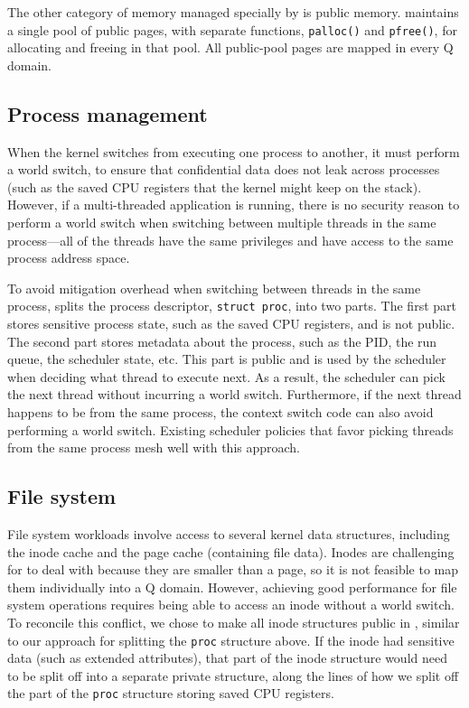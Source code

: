 The other category of memory managed specially by \sys is public memory.
\sys maintains a single pool of public pages, with separate functions,
\texttt{palloc()} and \texttt{pfree()}, for allocating and freeing in
that pool.  All public-pool pages are mapped in every Q domain.


\subsection{Process management}
\label{ss:proc}

When the \sys kernel switches from executing one process to another, it
must perform a world switch, to ensure that confidential data does not
leak across processes (such as the saved CPU registers that the kernel
might keep on the stack).  However, if a multi-threaded application
is running, there is no security reason to perform a world switch when
switching between multiple threads in the same process---all of the
threads have the same privileges and have access to the same process
address space.

To avoid mitigation overhead when switching between threads in the
same process, \sys splits the process descriptor, \texttt{struct
  proc}, into two parts.  The first part stores sensitive process
state, such as the saved CPU registers, and is not public.  The second
part stores metadata about the process, such as the PID, the run
queue, the scheduler state, etc.  This part is public and is used by
the scheduler when deciding what thread to execute next.  As a result,
the scheduler can pick the next thread without incurring a world
switch.  Furthermore, if the next thread happens to be from the same
process, the context switch code can also avoid performing a world
switch.  Existing scheduler policies that favor picking threads from
the same process mesh well with this approach.

\subsection{File system}
\label{ss:fs}

File system workloads involve access to several kernel data structures,
including the inode cache and the page cache (containing file data).
Inodes are challenging for \sys to deal with because they are smaller than
a page, so it is not feasible to map them individually into a Q domain.
However, achieving good performance for file system operations requires
being able to access an inode without a world switch.  To reconcile
this conflict, we chose to make all inode structures public in \sys,
similar to our approach for splitting the \texttt{proc} structure above.
If the inode had sensitive data (such as extended attributes), that
part of the inode structure would need to be split off into a separate
private structure, along the lines of how we split off the part of the
\texttt{proc} structure storing saved CPU registers.

